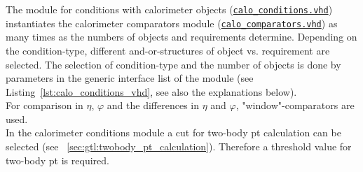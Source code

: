 The module for conditions with calorimeter objects (\href{https://github.com/cms-l1-globaltrigger/mp7_ugt_legacy/tree/master/firmware/hdl/gt_mp7_core/gtl_fdl_wrapper/gtl/calo_conditions.vhd}{\texttt{calo\_conditions.vhd}}) instantiates the calorimeter comparators module (\href{https://github.com/cms-l1-globaltrigger/mp7_ugt_legacy/tree/master/firmware/hdl/gt_mp7_core/gtl_fdl_wrapper/gtl/calo_comparators.vhd}{\texttt{calo\_comparators.vhd}}) as many times as the numbers of objects and requirements determine. Depending on the condition-type, different and-or-structures of object vs. requirement are selected.
The selection of condition-type and the number of objects is done by parameters in the generic interface list of the module (see Listing~\ref{lst:calo_conditions_vhd},
see also the explanations below).\\
For comparison in $\eta$, $\varphi$ and the differences in $\eta$ and $\varphi$, "window"-comparators are used.\\
In the calorimeter conditions module a cut for two-body pt calculation can be selected (see ~\ref{sec:gtl:twobody_pt_calculation}). Therefore a threshold value for two-body pt is required.\\



